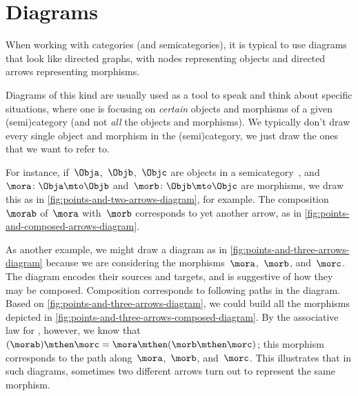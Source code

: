 
\section{Diagrams}

When working with categories (and semicategories), it is typical to use diagrams that look like directed graphs, with nodes representing objects and directed arrows representing morphisms.

Diagrams of this kind are usually used as a tool to speak and think about specific situations, where one is focusing on \emph{certain} objects and morphisms of a given (semi)category (and not \emph{all} the objects and morphisms).
We typically don't draw every single object and morphism in the (semi)category, we just draw the ones that we want to refer to.

    For instance, if~$\Obja$,~$\Objb$,~$\Objc$ are objects in a semicategory~\CatC, and~$\mora\colon \Obja \mto \Objb$ and~$\morb\colon \Objb \mto \Objc$ are morphisms, we draw this as in \cref{fig:points-and-two-arrows-diagram}, for example.
    The composition~$\morab$ of~$\mora$ with~$\morb$ corresponds to yet another arrow, as in \cref{fig:points-and-composed-arrows-diagram}.

\begin{marginfigure}
    \centering
    \caption{}
    \label{fig:points-and-two-arrows-diagram}
\end{marginfigure}

\begin{marginfigure}
    \centering
    \caption{}
    \label{fig:points-and-composed-arrows-diagram}
\end{marginfigure}



\begin{marginfigure}
    \centering
    \caption{}
    \label{fig:points-and-three-arrows-diagram}
\end{marginfigure}

\begin{marginfigure}
    \centering
    \caption{}
    \label{fig:points-and-three-arrows-composed-diagram}
\end{marginfigure}

As another example, we might draw a diagram as in \cref{fig:points-and-three-arrows-diagram} because we are considering the morphisms~$\mora$,~$\morb$, and~$\morc$.
The diagram encodes their sources and targets, and is suggestive of how they may be composed.
Composition corresponds to following paths in the diagram.
Based on \cref{fig:points-and-three-arrows-diagram}, we could build all the morphisms depicted in \cref{fig:points-and-three-arrows-composed-diagram}.
By the associative law for , however, we know that~$(\morab) \mthen \morc = \mora \mthen (\morb \mthen \morc)$;
this morphism corresponds to the path along~$\mora$,~$\morb$, and~$\morc$. This illustrates that in such diagrams, sometimes two different arrows turn out to represent the same morphism.

